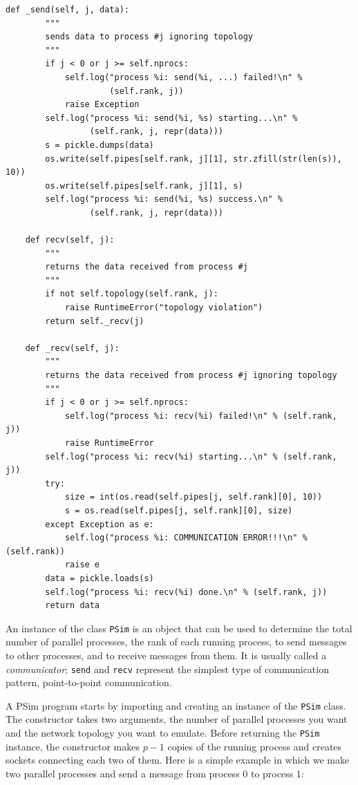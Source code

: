 \documentclass[justified, sixbynine]{tufte-book}
\def\ft{\small\tt}
\theoremstyle{plain}%
\newtheorem * {corollary}{Corollary}
\theoremstyle{definition}
\theoremstyle{remark}
\newtheorem * {remark}{Remark}
\newtheorem * {note}{Note}
\begin{document}
\begin{fullwidth}
\begin{lstlisting}[caption={in file: {\ft psim.py}}]
    def _send(self, j, data):
        """
        sends data to process #j ignoring topology
        """
        if j < 0 or j >= self.nprocs:
            self.log("process %i: send(%i, ...) failed!\n" %
                     (self.rank, j))
            raise Exception
        self.log("process %i: send(%i, %s) starting...\n" %
                 (self.rank, j, repr(data)))
        s = pickle.dumps(data)
        os.write(self.pipes[self.rank, j][1], str.zfill(str(len(s)), 10))
        os.write(self.pipes[self.rank, j][1], s)
        self.log("process %i: send(%i, %s) success.\n" %
                 (self.rank, j, repr(data)))

    def recv(self, j):
        """
        returns the data received from process #j
        """
        if not self.topology(self.rank, j):
            raise RuntimeError("topology violation")
        return self._recv(j)

    def _recv(self, j):
        """
        returns the data received from process #j ignoring topology
        """
        if j < 0 or j >= self.nprocs:
            self.log("process %i: recv(%i) failed!\n" % (self.rank, j))
            raise RuntimeError
        self.log("process %i: recv(%i) starting...\n" % (self.rank, j))
        try:
            size = int(os.read(self.pipes[j, self.rank][0], 10))
            s = os.read(self.pipes[j, self.rank][0], size)
        except Exception as e:
            self.log("process %i: COMMUNICATION ERROR!!!\n" % (self.rank))
            raise e
        data = pickle.loads(s)
        self.log("process %i: recv(%i) done.\n" % (self.rank, j))
        return data
\end{lstlisting}


An instance of the class {\ft PSim} is an object that can be used to determine the total number of parallel processes, the rank of each running process, to send messages to other processes, and to receive messages from them. It is usually called a {\it communicator}; {\ft send} and {\ft recv} represent the simplest type of communication pattern, point-to-point communication.

A PSim program starts by importing and creating an instance of the {\ft PSim} class. The constructor takes two arguments, the number of parallel processes you want and the network topology you want to emulate. Before returning the {\ft PSim} instance, the constructor makes $p-1$ copies of the running process and creates sockets connecting each two of them. Here is a simple example in which we make two parallel processes and send a message from process 0 to process 1:


\end{fullwidth}
\end{document}
